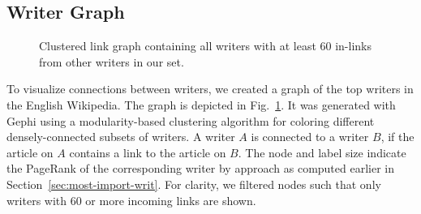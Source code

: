 \documentclass[a4paper,12pt]{scrartcl}
\begin{document}

\subsection{Writer Graph}\label{sec:writer-influences}

%


\begin{figure}
  \centering
  \caption{Clustered link graph containing all writers with at least
60 in-links from other writers in our set.}\label{fig:influence}
\end{figure}

To visualize connections between writers, we created a graph of the
top writers in the English Wikipedia. The graph is depicted in
Fig.~\ref{fig:influence}. It was generated with Gephi using a
modularity-based clustering algorithm for coloring different
densely-connected subsets of writers. A writer $A$ is connected to a
writer $B$, if the article on $A$ contains a link to the article on
$B$.
%
The node and label size indicate the PageRank of the corresponding
writer by approach \rprwriter as
computed earlier in Section~\ref{sec:most-import-writ}.  For clarity,
we filtered nodes such that only writers with 60 or more incoming
links are shown.
%
\end{document}
